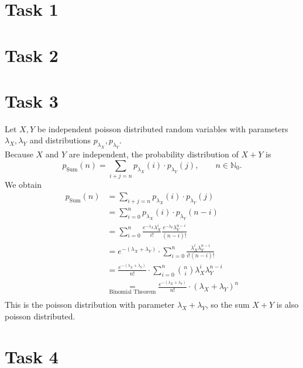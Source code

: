 \documentclass[%
   11pt,              %
   ngerman,           %
   a4paper,           %
   DIV11,             %
]{scrartcl}%
\begin{document}
\section*{Task 1}
\section*{Task 2}
\section*{Task 3}
Let $X, Y$ be independent poisson distributed random variables with parameters $\lambda_X, \lambda_Y$ and distributions $p_{\lambda_X}, p_{\lambda_Y}$. \\
Because $X$ and $Y$ are independent, the probability distribution of $X+Y$ is
\begin{equation*}
	p_\text{Sum}(n) = \sum_{i+j=n} p_{\lambda_X}(i) \cdot p_{\lambda_Y}(j), \qquad n \in \mathbb{N}_0.
\end{equation*} 
We obtain
\begin{align*}
	p_\text{Sum}(n) &= \sum_{i+j=n} p_{\lambda_X}(i) \cdot p_{\lambda_Y}(j) \\
	&= \sum_{i=0}^n p_{\lambda_X}(i) \cdot p_{\lambda_Y}(n-i) \\
	&= \sum_{i=0}^n \frac{e^{-\lambda_X}\lambda_X^i}{i!} \frac{e^{-\lambda_Y}\lambda_Y^{n-i}}{(n-i)!} \\
	&= e^{-(\lambda_X + \lambda_Y)} \cdot \sum_{i=0}^n  \frac{\lambda_X^i\lambda_Y^{n-i}}{i!(n-i)!} \\
	&= \frac{e^{-(\lambda_X + \lambda_Y)}}{n!} \cdot \sum_{i=0}^n  {n \choose i} \lambda_X^i\lambda_Y^{n-i} \\
	&\underset{\text{Binomial Theorem}}{=} \frac{e^{-(\lambda_X + \lambda_Y)}}{n!} \cdot (\lambda_X + \lambda_Y)^n \\
\end{align*}
This is the poisson distribution with parameter $\lambda_X + \lambda_Y$, so the sum $X + Y$ is also poisson distributed.
\section*{Task 4}
\end{document}
